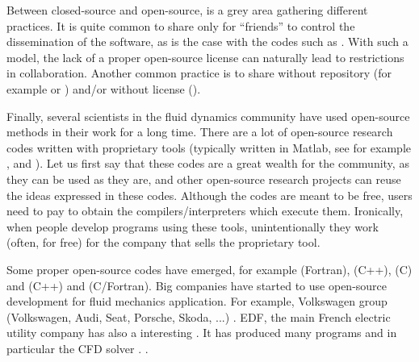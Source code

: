 Between closed-source and open-source, is a grey area gathering different
practices.
%
It is quite common to share only for ``friends'' to control the dissemination
of the software, as is the case with the codes such as
.
%
%
With such a model, the lack of a proper open-source license can naturally lead
to restrictions in collaboration.
%
Another common practice is to share without repository (for example
 or
) and/or
without license ().

Finally, several scientists in the fluid dynamics community have used
open-source methods in their work for a long time.
%
There are a lot of open-source research codes written with proprietary tools
(typically written in Matlab, see for example
,
 and
).
%
Let us first say that these codes are a great wealth for the community, as they
can be used as they are, and other open-source research projects can reuse
the ideas expressed in these codes.
%
Although the codes are meant to be free, users need to pay to obtain the
compilers/interpreters which execute them.
%
Ironically, when people develop programs using these tools, unintentionally
they work (often, for free) for the company that sells the proprietary tool.

Some proper open-source codes have emerged, for example
 (Fortran),
 (C++),
 (C) and
 (C++) and
 (C/Fortran).
%
Big companies have started to use open-source development for fluid mechanics
application. For example, Volkswagen group (Volkswagen, Audi, Seat, Porsche,
Skoda, ...) .
%
EDF, the main French electric utility company has also a interesting
. It has produced many programs and in particular the CFD
solver .
%
.

